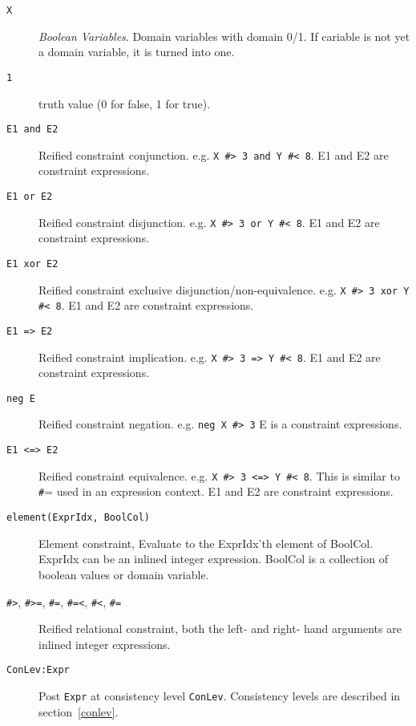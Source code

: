 \begin{description}
\item[\texttt{X}]
            \emph{Boolean Variables}.  Domain variables with domain 0/1. If cariable 
	    is not yet a domain variable, it is turned into one.

\item[\texttt{1}]
            truth value (0 for false, 1 for true).


\item[\texttt{E1 and E2}]
            Reified constraint conjunction.  e.g. \verb'X #> 3 and Y #< 8'.
	    E1 and E2 are constraint expressions.

\item[\texttt{E1 or E2}]
            Reified constraint disjunction.  e.g. \verb'X #> 3 or Y #< 8'.
	    E1 and E2 are constraint expressions.

\item[\texttt{E1 xor E2}]
            Reified constraint exclusive disjunction/non-equivalence.  e.g. \verb'X #> 3 xor Y #< 8'.
	    E1 and E2 are constraint expressions.

\item[\texttt{E1 => E2}]
            Reified constraint implication.  e.g. \verb'X #> 3 => Y #< 8'.
	    E1 and E2 are constraint expressions.

\item[\texttt{neg E}]
            Reified constraint negation.  e.g. \verb'neg X #> 3'
	    E is a constraint expressions.

\item[\texttt{E1 <=> E2}]
            Reified constraint equivalence.  e.g. \verb'X #> 3 <=> Y #< 8'.
            This is similar to {\texttt \#=} used in an expression context.
	    E1 and E2 are constraint expressions.

\item[\texttt{element(ExprIdx, BoolCol)}]
            Element constraint, Evaluate to the ExprIdx'th element of BoolCol.
	    ExprIdx can be an inlined integer expression. BoolCol is a
	    collection of boolean values or domain variable.

\item[
    \texttt{\#>}, \texttt{\#>=}, \texttt{\#=}, \texttt{\#=<},
 \texttt{\#<},
    \texttt{\#\bsl=}]

    Reified relational constraint, both the left- and right- hand arguments are
    inlined integer expressions.

\item[\texttt{ConLev:Expr}]
    Post \texttt{Expr} at consistency level \texttt{ConLev}. Consistency
    levels are described in section~\ref{conlev}. 


\end{description}

